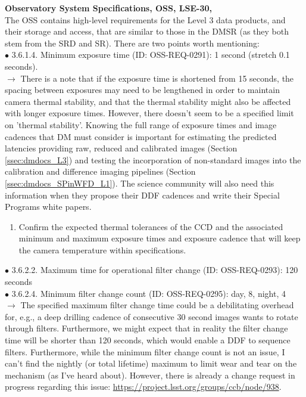 \documentclass[DM,lsstdraft,toc]{lsstdoc}
\begin{document}
\noindent \textbf{Observatory System Specifications, OSS, LSE-30, \cite{LSE-30}}\\
The OSS contains high-level requirements for the Level 3 data products, and their storage and access, that are similar to those in the DMSR (as they both stem from the SRD and SR). There are two points worth mentioning: \\
$\bullet$ 3.6.1.4. Minimum exposure time (ID: OSS-REQ-0291): 1 second (stretch 0.1 seconds). \\
$\rightarrow$ There is a note that if the exposure time is shortened from 15 seconds, the spacing between exposures may need to be lengthened in order to maintain camera thermal stability, and that the thermal stability might also be affected with longer exposure times. However, there doesn't seem to be a specified limit on 'thermal stability'. Knowing the full range of exposure times and image cadences that DM must consider is important for estimating the predicted latencies providing raw, reduced and calibrated images (Section \ref{ssec:dmdocs_L3}) and testing the incorporation of non-standard images into the calibration and difference imaging pipelines (Section \ref{ssec:dmdocs_SPinWFD_L1}). The science community will also need this information when they propose their DDF cadences and write their Special Programs white papers.
\begin{enumerate}[resume,topsep=-10pt,label= \textbf{Concern \Roman*.}] \item \label{C5} Confirm the expected thermal tolerances of the CCD and the associated minimum and maximum exposure times and exposure cadence that will keep the camera temperature within specifications. \end{enumerate}
$\bullet$ 3.6.2.2. Maximum time for operational filter change (ID: OSS-REQ-0293): 120 seconds \\
$\bullet$ 3.6.2.4. Minimum filter change count (ID: OSS-REQ-0295): day, 8, night, 4 \\
$\rightarrow$ The specified maximum filter change time could be a debilitating overhead for, e.g., a deep drilling cadence of consecutive 30 second images wants to rotate through filters. Furthermore, we might expect that in reality the filter change time will be shorter than 120 seconds, which would enable a DDF to sequence filters. Furthermore, while the minimum filter change count is not an issue, I can't find the nightly (or total lifetime) maximum to limit wear and tear on the mechanism (as I've heard about). However, there is already a change request in progress regarding this issue: \url{https://project.lsst.org/groups/ccb/node/938}.
\end{document}
